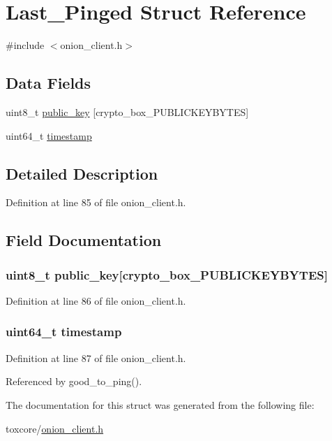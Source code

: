 \hypertarget{struct_last___pinged}{\section{Last\+\_\+\+Pinged Struct Reference}
\label{struct_last___pinged}
}


{\ttfamily \#include $<$onion\+\_\+client.\+h$>$}

\subsection*{Data Fields}
\begin{DoxyCompactItemize}
\item 
uint8\+\_\+t \hyperlink{struct_last___pinged_aaa806bb1136fb3d4b5d8d8970b596ff7}{public\+\_\+key} \mbox{[}crypto\+\_\+box\+\_\+\+P\+U\+B\+L\+I\+C\+K\+E\+Y\+B\+Y\+T\+E\+S\mbox{]}
\item 
uint64\+\_\+t \hyperlink{struct_last___pinged_a465bef81f6478756e5443025b1f2ddfa}{timestamp}
\end{DoxyCompactItemize}


\subsection{Detailed Description}


Definition at line 85 of file onion\+\_\+client.\+h.



\subsection{Field Documentation}
\hypertarget{struct_last___pinged_aaa806bb1136fb3d4b5d8d8970b596ff7}{
\subsubsection[{public\+\_\+key}]{\setlength{\rightskip}{0pt plus 5cm}uint8\+\_\+t public\+\_\+key\mbox{[}crypto\+\_\+box\+\_\+\+P\+U\+B\+L\+I\+C\+K\+E\+Y\+B\+Y\+T\+E\+S\mbox{]}}}\label{struct_last___pinged_aaa806bb1136fb3d4b5d8d8970b596ff7}


Definition at line 86 of file onion\+\_\+client.\+h.

\hypertarget{struct_last___pinged_a465bef81f6478756e5443025b1f2ddfa}{
\subsubsection[{timestamp}]{\setlength{\rightskip}{0pt plus 5cm}uint64\+\_\+t timestamp}}\label{struct_last___pinged_a465bef81f6478756e5443025b1f2ddfa}


Definition at line 87 of file onion\+\_\+client.\+h.



Referenced by good\+\_\+to\+\_\+ping().



The documentation for this struct was generated from the following file\+:\begin{DoxyCompactItemize}
\item 
toxcore/\hyperlink{onion__client_8h}{onion\+\_\+client.\+h}\end{DoxyCompactItemize}
